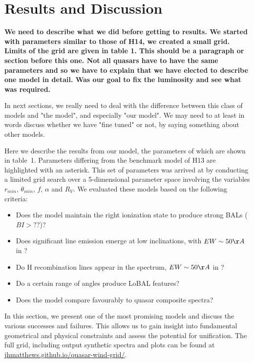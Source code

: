 \documentclass[preprint, a4paper, 11pt]{aastex}
\begin{document}




\section{Results and Discussion}

{\bf We need to describe what we did before getting to results.  We started with parameters similar to those of H14, we created a small grid.  Limits of the grid are given in table 1.  This should be a paragraph or section before this one.  Not all quasars have to have the same parameters and so we have to explain that we have elected to describe one model in detail.  Was our goal to fix the luminosity and see what was required.

In next sections, we really need to deal with the difference between this class of models and "the model", and especially "our model".  We may need to at least in words discuss whether we have "fine tuned" or not, by saying something about other models.}

Here we describe the results from our model, the parameters
of which are shown in table~1.
Parameters differing from the benchmark model of
H13 are highlighted with an asterisk.
This set of parameters
was arrived at by conducting a limited grid search over a 
5-dimensional parameter space involving the variables
$r_{min}$, $\theta_{min}$, $f$, $\alpha$ and $R_V$.
We evaluated these models based on the following
criteria:
\begin{itemize}
\item Does the model maintain the right ionization state to produce strong BALs ($BI > ??$)?
\item Does significant line emission emerge at low inclinations, with $EW\sim50\AA$ in \civ?
\item Do H recombination lines appear in the spectrum, $EW\sim50\AA$ in \la?
\item Do a certain range of angles produce LoBAL features?
\item Does the model compare favourably to quasar composite spectra?
\end{itemize}
In this section, we present one of the most promising models and discuss
the various successes and failures.
This allows us to gain insight into fundamental geometrical 
and physical constraints and assess the potential for unification. 
The full grid, including output synthetic spectra and plots can be found at
\url{jhmatthews.github.io/quasar-wind-grid/}.
\end{document}
